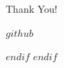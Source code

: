 \documentclass[aspectratio=169]{beamer}
\begin{document}
\begin{frame}[plain]
  \begin{center}

    \vfill

    {
     Thank You!\par}

    \vspace{1em}


    \vspace{1em}

    {\small
     \href{$github$}{\texttt{$github$}}\par}

    \vfill

  \end{center}
\end{frame}

$endif$
$endif$
\end{document}
